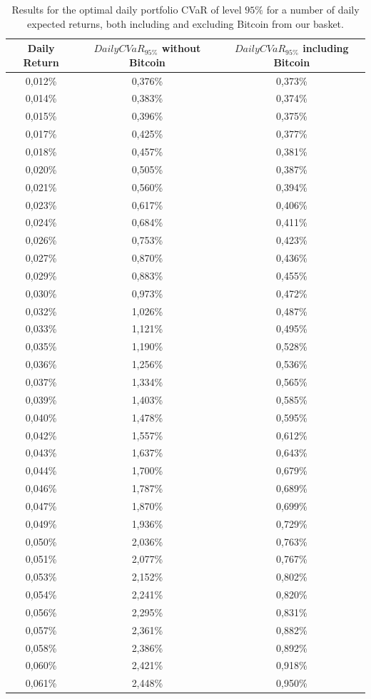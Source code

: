 \begin{table}
\begin{tabular}{ccc}
	\toprule
	Daily Return & $DailyCVaR_{95\%}$ without Bitcoin & $DailyCVaR_{95\%}$ including Bitcoin \\
	\midrule
	0,012\% & 0,376\% & 0,373\% \\
	0,014\% & 0,383\% & 0,374\% \\
	0,015\% & 0,396\% & 0,375\% \\
	0,017\% & 0,425\% & 0,377\% \\
	0,018\% & 0,457\% & 0,381\% \\
	0,020\% & 0,505\% & 0,387\% \\
	0,021\% & 0,560\% & 0,394\% \\
	0,023\% & 0,617\% & 0,406\% \\
	0,024\% & 0,684\% & 0,411\% \\
	0,026\% & 0,753\% & 0,423\% \\
	0,027\% & 0,870\% & 0,436\% \\
	0,029\% & 0,883\% & 0,455\% \\
	0,030\% & 0,973\% & 0,472\% \\
	0,032\% & 1,026\% & 0,487\% \\
	0,033\% & 1,121\% & 0,495\% \\
	0,035\% & 1,190\% & 0,528\% \\
	0,036\% & 1,256\% & 0,536\% \\
	0,037\% & 1,334\% & 0,565\% \\
	0,039\% & 1,403\% & 0,585\% \\
	0,040\% & 1,478\% & 0,595\% \\
	0,042\% & 1,557\% & 0,612\% \\
	0,043\% & 1,637\% & 0,643\% \\
	0,044\% & 1,700\% & 0,679\% \\
	0,046\% & 1,787\% & 0,689\% \\
	0,047\% & 1,870\% & 0,699\% \\
	0,049\% & 1,936\% & 0,729\% \\
	0,050\% & 2,036\% & 0,763\% \\
	0,051\% & 2,077\% & 0,767\% \\
	0,053\% & 2,152\% & 0,802\% \\
	0,054\% & 2,241\% & 0,820\% \\
	0,056\% & 2,295\% & 0,831\% \\
	0,057\% & 2,361\% & 0,882\% \\
	0,058\% & 2,386\% & 0,892\% \\
	0,060\% & 2,421\% & 0,918\% \\
	0,061\% & 2,448\% & 0,950\% \\
	\bottomrule
\end{tabular}
\caption{Results for the optimal daily portfolio CVaR of level $95\%$ for a number of daily expected returns, both including and excluding Bitcoin from our basket.}
\label{tab:return_cvar}
\end{table}

